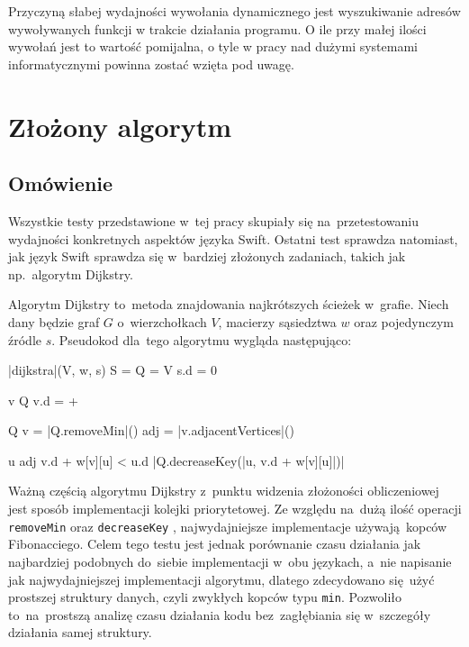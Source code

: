 \documentclass[mgr, shortabstract]{iithesis}
\newcommand{\swiftinline}[1]{
    \texttt{#1}
}
\begin{document}
Przyczyną słabej wydajności wywołania dynamicznego jest wyszukiwanie adresów wywoływanych funkcji w trakcie działania programu. O ile przy małej ilości wywołań jest to wartość pomijalna, o tyle w pracy nad dużymi systemami informatycznymi powinna zostać wzięta pod uwagę.

\section{Złożony algorytm}

\subsection{Omówienie}

Wszystkie testy przedstawione w~tej pracy skupiały się na~przetestowaniu wydajności konkretnych aspektów języka Swift. Ostatni test sprawdza natomiast, jak język Swift sprawdza się w~bardziej złożonych zadaniach, takich jak np.~algorytm Dijkstry.

Algorytm Dijkstry to~metoda znajdowania najkrótszych ścieżek w~grafie. Niech dany będzie graf $G$ o~wierzchołkach $V$, macierzy sąsiedztwa $w$ oraz pojedynczym źródle $s$. Pseudokod dla~tego algorytmu wygląda następująco:

\begin{algorithm}
\begin{program}
    \PROC |dijkstra|(V, w, s)
        S = \emptyset {}
        Q = V 
        s.d = 0

        \FOR v \in Q \DO
            v.d = +\infty
        \END

        \WHILE Q \neq \emptyset
            v = |Q.removeMin|()
            adj = |v.adjacentVertices|()

            \FOR u \in adj \DO
                \IF v.d + w[v][u] < u.d
                    \THEN |Q.decreaseKey(|u, v.d + w[v][u]|)|
                \FI
            \END
        \END
\end{program}
\end{algorithm}

Ważną częścią algorytmu Dijkstry z~punktu widzenia złożoności obliczeniowej jest sposób implementacji kolejki priorytetowej. Ze względu na~dużą ilość operacji \swiftinline{removeMin} oraz \swiftinline{decreaseKey}, najwydajniejsze implementacje używają kopców Fibonacciego. Celem tego testu jest jednak porównanie czasu działania jak najbardziej podobnych do~siebie implementacji w~obu językach, a~nie napisanie jak najwydajniejszej implementacji algorytmu, dlatego zdecydowano się użyć prostszej struktury danych, czyli zwykłych kopców typu \texttt{min}. Pozwoliło to~na~prostszą analizę czasu działania kodu bez~zagłębiania się w~szczegóły działania samej struktury.
\end{document}
